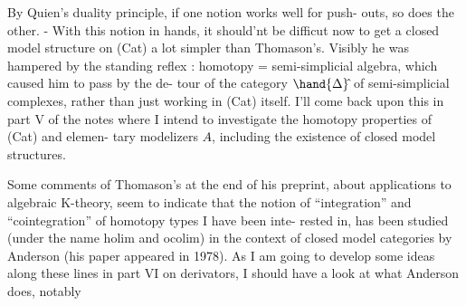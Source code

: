 By  Quien's duality principle,  if one notion works well for push-%
outs,  so does the other.  -  With this notion in hands,  it should'nt
be difficut now to get a closed model structure on (Cat) a lot simpler
than Thomason's.  Visibly he was hampered by the standing reflex :
homotopy = semi-simplicial algebra,  which caused him to pass by the de-%
tour of the category $\hand{\Delta}\hat{}$ of semi-simplicial complexes,  rather than just
working in (Cat) itself.  I'll  come back upon this in part V  of the notes\hand{,}
where I intend to investigate the homotopy properties of (Cat) and elemen-%
tary modelizers $A\hat{}$,  including the existence of closed model structures.

    Some comments of Thomason's at the end of his preprint,  about
applications to algebraic K-theory,  seem to indicate that the notion
of ``integration'' and ``cointegration'' of homotopy types I have been inte-%
rested in,  has been studied (under the name holim and ocolim) in the
context of closed model categories by Anderson  (his paper appeared in
1978).   As I am going to develop some ideas along these lines in part VI
on derivators,  I should have a look at what Anderson does,  notably

